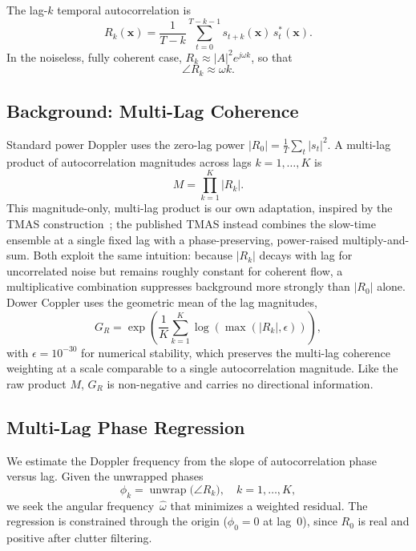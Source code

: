 \documentclass[11pt]{article}
\begin{document}
The lag-$k$ temporal autocorrelation is
\begin{equation}
  R_k(\bm{x})
  = \frac{1}{T - k} \sum_{t=0}^{T-k-1}
    s_{t+k}(\bm{x})\, s_t^*(\bm{x}).
  \label{eq:autocorr}
\end{equation}
In the noiseless, fully coherent case,
$R_k \approx |A|^2 e^{j \omega k}$, so that
\begin{equation}
  \angle R_k \approx \omega k.
  \label{eq:phase_linear}
\end{equation}

\subsection{Background: Multi-Lag Coherence}
\label{sec:tmas_background}

Standard power Doppler uses the zero-lag power $|R_0| =
\frac{1}{T}\sum_t |s_t|^2$.  A multi-lag product of
autocorrelation magnitudes across lags $k = 1, \ldots, K$ is
\begin{equation}
  M = \prod_{k=1}^{K} |R_k|.
  \label{eq:tmas}
\end{equation}
This magnitude-only, multi-lag product is our own adaptation,
inspired by the TMAS construction~\cite{shen2022tmas}; the published
TMAS instead combines the slow-time ensemble at a single fixed lag
with a phase-preserving, power-raised multiply-and-sum.  Both exploit
the same intuition: because $|R_k|$ decays with lag for
uncorrelated noise but remains roughly constant for coherent flow, a
multiplicative combination suppresses background more strongly than
$|R_0|$ alone.  Dower Coppler uses the geometric mean of the
lag magnitudes,
\begin{equation}
  G_R =
  \exp\!\left(\frac{1}{K}\sum_{k=1}^{K}\log\left(\max(|R_k|,\epsilon)\right)\right),
  \label{eq:geomean_r}
\end{equation}
with $\epsilon=10^{-30}$ for numerical stability, which preserves the
multi-lag coherence weighting at a scale comparable to a single
autocorrelation magnitude.  Like the raw product $M$, $G_R$ is
non-negative and carries no directional information.

\subsection{Multi-Lag Phase Regression}
\label{sec:phase_regression}

We estimate the Doppler frequency from the slope of autocorrelation
phase versus lag.  Given the unwrapped phases
\begin{equation}
  \phi_k = \operatorname{unwrap}\bigl(\angle R_k\bigr),
  \quad k = 1, \ldots, K,
\end{equation}
we seek the angular frequency~$\hat\omega$ that minimizes a weighted
residual.  The regression is constrained through the origin ($\phi_0 =
0$ at lag~$0$), since $R_0$ is real and positive after clutter
filtering.
\end{document}

